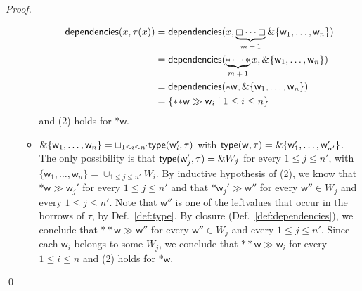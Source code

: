 \begin{proof}
\begin{itemize}
\begin{itemize}
\begin{align*}
        \mathsf{dependencies}(x,\tau(x))&=\mathsf{dependencies}(x,\underbrace{\boxempty\cdots\boxempty}_{\text{$m+1$}}\&\{\mathsf{w}_1,\ldots,\mathsf{w}_n\})\\
        &=\mathsf{dependencies}(\underbrace{\mathtt{*}\cdots\mathtt{*}}_{\text{$m+1$}}x,
        \&\{\mathsf{w}_1,\ldots,\mathsf{w}_n\})\\
        &=\mathsf{dependencies}(\mathtt{*}\mathsf{w},\&\{\mathsf{w}_1,\ldots,\mathsf{w}_n\})\\
        &=\{\mathtt{**}\mathsf{w}\gg\mathsf{w}_i\mid 1\le i\le n\}
      \end{align*}
      and (2) holds for $\mathtt{*}\mathsf{w}$.
    \item $\&\{\mathsf{w}_1,\ldots,\mathsf{w}_n\}=\sqcup_{1\le i\le n'}\mathsf{type}(\mathsf{w}_i',\tau)$
      with $\mathsf{type}(\mathsf{w},\tau)=\&\{\mathsf{w}'_1,\ldots,\mathsf{w}'_{n'}\}$.
      The only possibility is that $\mathsf{type}(\mathsf{w}_j',\tau)=\& W_j$ for every $1\le j\le n'$,
      with $\{\mathsf{w}_1,\ldots,\mathsf{w}_n\}=\cup_{1\le j\le n'}W_i$.
      By inductive hypothesis of (2), we know that
      $\mathtt{*}\mathsf{w}\gg\mathsf{w}_j'$ for every $1\le j\le n'$ and that
      $\mathtt{*}\mathsf{w}_j'\gg\mathsf{w}''$ for every $\mathsf{w}''\in W_j$ and
      every $1\le j\le n'$. Note that $\mathsf{w}''$ is one of the leftvalues that occur
      in the borrows of $\tau$, by Def.~\ref{def:type}.
      By closure (Def.~\ref{def:dependencies}), we conclude that
      $\mathtt{**}\mathsf{w}\gg\mathsf{w}''$ for every $\mathsf{w}''\in W_j$ and
      every $1\le j\le n'$. Since each $\mathsf{w}_i$ belongs to some $W_j$, we conclude that
      $\mathtt{**}\mathsf{w}\gg\mathsf{w}_i$ for every $1\le i\le n$ and (2) holds for $\mathtt{*}\mathsf{w}$.
    \end{itemize}
  \end{itemize}
  \qed
\end{proof}
